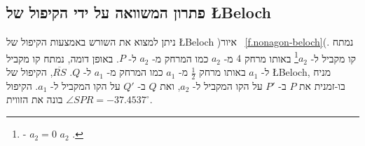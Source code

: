 

\subsection{פתרון המשוואה על ידי הקיפול של
\L{Beloch}}

ניתן למצוא את השורש באמצעות הקיפול של 
\L{Beloch}
)איור~%
\ref{f.nonagon-beloch}(.
נמתח קו מקביל ל-%
$a_2$\footnote{%
-%
$a_2=0$
$a_2$
.}
באותו מרחק 
$4$
מ-%
$a_2$
כמו המרחק מ-%
$a_2$
ל-%
$P$.
באופן דומה, נמתח קו מקביל ל-%
$a_1$
באותו מרחק 
$\frac{1}{2}$
מ-%
$a_1$
כמו המרחק מ-%
$a_1$
ל-%
$Q$.
$\overline{RS}$,
הקיפול של
\L{Beloch},
מניח בו-זמנית את
$P$
ב-%
$P'$
על הקו המקביל ל-%
$a_2$,
ואת
$Q$
ב-%
$Q'$
על הקו המקביל ל-%
$a_1$.
הקיפול בונה את הזווית
$\angle SPR=-37.4537^\circ$.
